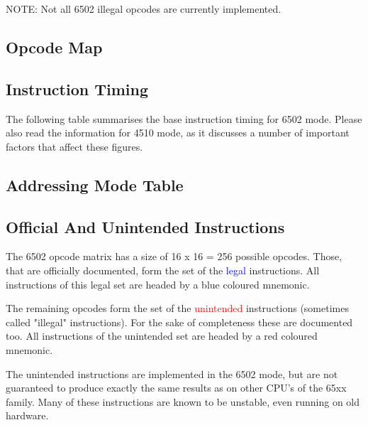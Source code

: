 NOTE: Not all 6502 illegal opcodes are currently implemented.

\subsection{Opcode Map}

\begin{center}
\end{center}

\subsection{Instruction Timing}

The following table summarises the base instruction timing for 6502 mode.
Please also read the information for 4510 mode, as it discusses a number
of important factors that affect these figures.

\begin{center}
\end{center}

\subsection{Addressing Mode Table}

\begin{center}
\end{center}

\subsection{Official And Unintended Instructions}

The 6502 opcode matrix has a size of 16 x 16 = 256 possible opcodes.
Those, that are officially documented, form the set of the
\textcolor{blue}{legal} instructions.
All instructions of this legal set are headed by a blue coloured mnemonic.

The remaining opcodes form the set of the
\textcolor{red}{unintended} instructions
(sometimes called "illegal" instructions).
For the sake of completeness these are documented too.
All instructions of the unintended set are headed by a red coloured mnemonic.

The unintended instructions are implemented in the 6502 mode,
but are not guaranteed to produce exactly the same results as on other
CPU's of the 65xx family. Many of these instructions are known to
be unstable, even running on old hardware.

